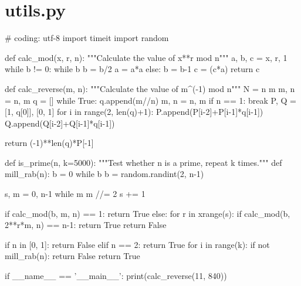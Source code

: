 \documentclass[UTF8,nofonts,cs4size]{ctexrep}
\begin{document}
\section*{utils.py}
\begin{python}
# coding: utf-8
import timeit
import random

def calc_mod(x, r, n):
    """Calculate the value of x**r mod n"""
    a, b, c = x, r, 1
    while b != 0:
        while b%
            b = b/2
            a = a*a%
        else:
            b = b-1
            c = (c*a)%
    return c

def calc_reverse(m, n):
    """Calculate the value of m^(-1) mod n"""
    N = n
    m %
    m, n = n, m
    q = []
    while True:
        q.append(m//n)
        m, n = n, m%
        if n == 1:
            break
    P, Q = [1, q[0]], [0, 1]
    for i in range(2, len(q)+1):
        P.append(P[i-2]+P[i-1]*q[i-1])
        Q.append(Q[i-2]+Q[i-1]*q[i-1])

    return (-1)**len(q)*P[-1]%

def is_prime(n, k=5000):
    """Test whether n is a prime, repeat k times."""
    def mill_rab(n):
        b = 0
        while b%
            b = random.randint(2, n-1)     
        
        s, m = 0, n-1
        while m%
            m //= 2
            s += 1

        if calc_mod(b, m, n) == 1:
            return True
        else:
            for r in xrange(s):
                if calc_mod(b, 2**r*m, n) == n-1:
                    return True
        return False

    if n in [0, 1]:
        return False
    elif n == 2:
        return True
    for i in range(k):
        if not mill_rab(n):
            return False
    return True

if __name__ == '__main__':
    print(calc_reverse(11, 840))

\end{python}
\end{document}
